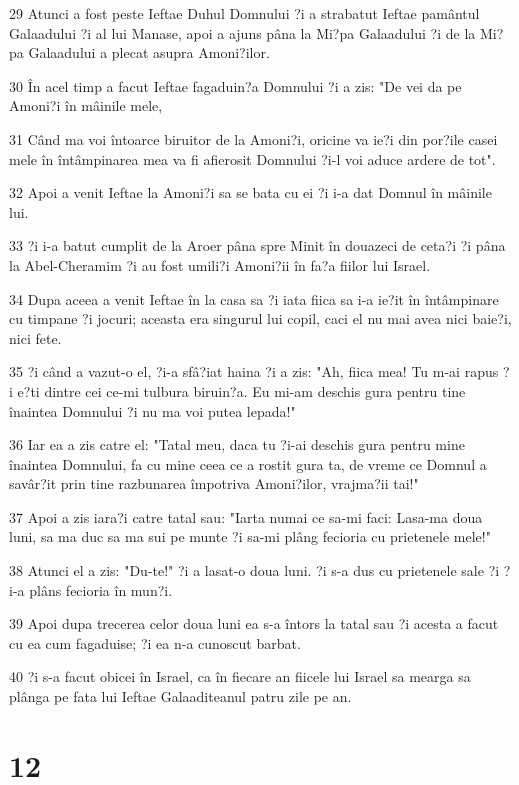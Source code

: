 \par 29 Atunci a fost peste Ieftae Duhul Domnului ?i a strabatut Ieftae pamântul Galaadului ?i al lui Manase, apoi a ajuns pâna la Mi?pa Galaadului ?i de la Mi?pa Galaadului a plecat asupra Amoni?ilor.
\par 30 În acel timp a facut Ieftae fagaduin?a Domnului ?i a zis: "De vei da pe Amoni?i în mâinile mele,
\par 31 Când ma voi întoarce biruitor de la Amoni?i, oricine va ie?i din por?ile casei mele în întâmpinarea mea va fi afierosit Domnului ?i-l voi aduce ardere de tot".
\par 32 Apoi a venit Ieftae la Amoni?i sa se bata cu ei ?i i-a dat Domnul în mâinile lui.
\par 33 ?i i-a batut cumplit de la Aroer pâna spre Minit în douazeci de ceta?i ?i pâna la Abel-Cheramim ?i au fost umili?i Amoni?ii în fa?a fiilor lui Israel.
\par 34 Dupa aceea a venit Ieftae în la casa sa ?i iata fiica sa i-a ie?it în întâmpinare cu timpane ?i jocuri; aceasta era singurul lui copil, caci el nu mai avea nici baie?i, nici fete.
\par 35 ?i când a vazut-o el, ?i-a sfâ?iat haina ?i a zis: "Ah, fiica mea! Tu m-ai rapus ?i e?ti dintre cei ce-mi tulbura biruin?a. Eu mi-am deschis gura pentru tine înaintea Domnului ?i nu ma voi putea lepada!"
\par 36 Iar ea a zis catre el: "Tatal meu, daca tu ?i-ai deschis gura pentru mine înaintea Domnului, fa cu mine ceea ce a rostit gura ta, de vreme ce Domnul a savâr?it prin tine razbunarea împotriva Amoni?ilor, vrajma?ii tai!"
\par 37 Apoi a zis iara?i catre tatal sau: "Iarta numai ce sa-mi faci: Lasa-ma doua luni, sa ma duc sa ma sui pe munte ?i sa-mi plâng fecioria cu prietenele mele!"
\par 38 Atunci el a zis: "Du-te!" ?i a lasat-o doua luni. ?i s-a dus cu prietenele sale ?i ?i-a plâns fecioria în mun?i.
\par 39 Apoi dupa trecerea celor doua luni ea s-a întors la tatal sau ?i acesta a facut cu ea cum fagaduise; ?i ea n-a cunoscut barbat.
\par 40 ?i s-a facut obicei în Israel, ca în fiecare an fiicele lui Israel sa mearga sa plânga pe fata lui Ieftae Galaaditeanul patru zile pe an.

\chapter{12}

